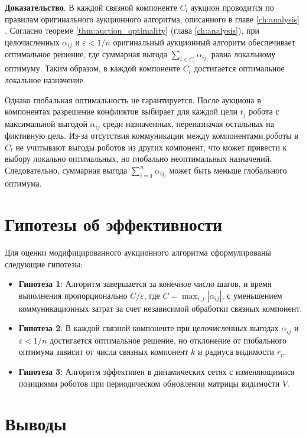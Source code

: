 \textbf{Доказательство}. 
В каждой связной компоненте \( C_l \) аукцион проводится по правилам оригинального аукционного алгоритма, описанного в главе \ref{ch:analysis} \cite{bertsekas1990}. Согласно теореме \ref{thm:auction_optimality} (глава \ref{ch:analysis}), при целочисленных \( \alpha_{ij} \) и \( \varepsilon < 1/n \) оригинальный аукционный алгоритм обеспечивает оптимальное решение, где суммарная выгода \( \sum_{i \in C_l} \alpha_{i j_i} \) равна локальному оптимуму. Таким образом, в каждой компоненте \( C_l \) достигается оптимальное локальное назначение. 

Однако глобальная оптимальность не гарантируется. После аукциона в компонентах разрешение конфликтов выбирает для каждой цели \( t_j \) робота с максимальной выгодой \( \alpha_{ij} \) среди назначенных, переназначая остальных на фиктивную цель. Из-за отсутствия коммуникации между компонентами роботы в \( C_l \) не учитывают выгоды роботов из других компонент, что может привести к выбору локально оптимальных, но глобально неоптимальных назначений. Следовательно, суммарная выгода \( \sum_{i=1}^n \alpha_{i j_i} \) может быть меньше глобального оптимума.

\section{Гипотезы об эффективности}

Для оценки модифицированного аукционного алгоритма сформулированы следующие гипотезы:
\begin{itemize}
    \item \textbf{Гипотеза 1}: Алгоритм завершается за конечное число шагов, и время выполнения пропорционально \( C / \varepsilon \), где \( C = \max_{i,j} |\alpha_{ij}| \), с уменьшением коммуникационных затрат за счет независимой обработки связных компонент.
    \item \textbf{Гипотеза 2}: В каждой связной компоненте при целочисленных выгодах \( \alpha_{ij} \) и \( \varepsilon < 1/n \) достигается оптимальное решение, но отклонение от глобального оптимума зависит от числа связных компонент \( k \) и радиуса видимости \( r_v \).
    \item \textbf{Гипотеза 3}: Алгоритм эффективен в динамических сетях с изменяющимися позициями роботов при периодическом обновлении матрицы видимости \( V \).
\end{itemize}

\section{Выводы}

